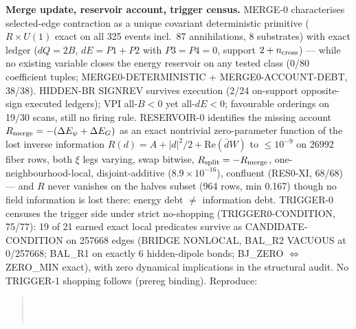 \documentclass[11pt]{article}
\begin{document}
\textbf{Merge update, reservoir account, trigger census.} MERGE-0
characterises selected-edge contraction as a unique covariant deterministic
primitive ($R \times U(1)$ exact on all 325 events incl.\ 87 annihilations,
8 substrates) with exact ledger ($dQ = 2B$, $dE = P1 + P2$ with
$P3 = P4 = 0$, support $2 + n_{\rm cross}$) --- while no existing variable
closes the energy reservoir on any tested class (0/80 coefficient tuples;
MERGE0-DETERMINISTIC + MERGE0-ACCOUNT-DEBT, 38/38). HIDDEN-BR SIGNREV
survives execution (2/24 on-support opposite-sign executed ledgers); VPI
all-$B < 0$ yet all-$dE < 0$; favourable orderings on 19/30 scans, still
no firing rule. RESERVOIR-0 identifies the missing account
$R_{\rm merge} = -(\Delta E_\psi + \Delta E_G)$ as an exact nontrivial
zero-parameter function of the lost inverse information
$R(d) = A + |d|^2/2 + \mathrm{Re}(\bar d W)$ to $\le 10^{-9}$ on 26992
fiber rows, both $\xi$ legs varying, swap bitwise, $R_{\rm split} =
-R_{\rm merge}$, one-neighbourhood-local, disjoint-additive
($8.9\times10^{-16}$), confluent (RES0-XI, 68/68) --- and $R$ never
vanishes on the halves subset (964 rows, min 0.167) though no field
information is lost there: energy debt $\ne$ information debt.
TRIGGER-0 censuses the trigger side under strict no-shopping
(TRIGGER0-CONDITION, 75/77): 19 of 21 earned exact local predicates
survive as CANDIDATE-CONDITION on 257668 edges (BRIDGE NONLOCAL,
BAL\_R2 VACUOUS at 0/257668; BAL\_R1 on exactly 6 hidden-dipole bonds;
BJ\_ZERO $\iff$ ZERO\_MIN exact), with zero dynamical implications in the
structural audit. No TRIGGER-1 shopping follows (prereg binding).
Reproduce:
\begin{quote}\small
{}\\
\\
\end{quote}
\end{document}
